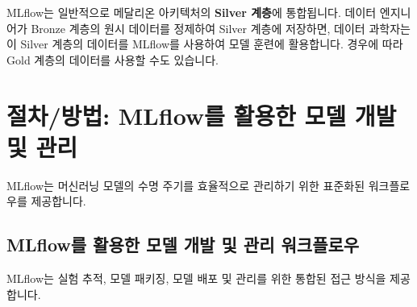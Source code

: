 \documentclass[11pt,a4paper]{article}
\begin{document}
\begin{tcolorbox}[summarybox={MLflow와 아키텍처 통합}]
MLflow는 일반적으로 메달리온 아키텍처의 \textbf{Silver 계층}에 통합됩니다. 데이터 엔지니어가 Bronze 계층의 원시 데이터를 정제하여 Silver 계층에 저장하면, 데이터 과학자는 이 Silver 계층의 데이터를 MLflow를 사용하여 모델 훈련에 활용합니다. 경우에 따라 Gold 계층의 데이터를 사용할 수도 있습니다.
\end{tcolorbox}

\newpage
\section*{절차/방법: MLflow를 활용한 모델 개발 및 관리}
MLflow는 머신러닝 모델의 수명 주기를 효율적으로 관리하기 위한 표준화된 워크플로우를 제공합니다.

\subsection*{MLflow를 활용한 모델 개발 및 관리 워크플로우}
MLflow는 실험 추적, 모델 패키징, 모델 배포 및 관리를 위한 통합된 접근 방식을 제공합니다.
\end{document}
